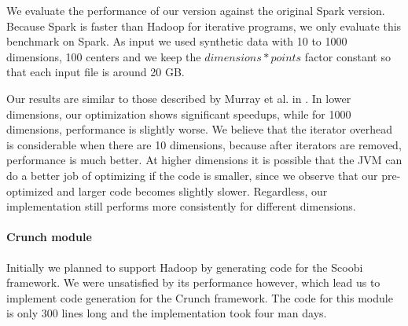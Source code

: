 We evaluate the performance of our version against the original Spark version.
Because Spark is faster than Hadoop for iterative programs, we only evaluate
this benchmark on Spark.
As input we used synthetic data with 10 to 1000 dimensions, 100 centers and we
keep the $dimensions * points$ factor constant so that each input file is around 20 GB.

Our results are similar to those described by Murray et al. in
\cite{murray_steno:_2011}. In lower dimensions, our optimization shows
significant speedups, while for 1000 dimensions, performance is
slightly worse. We believe that the iterator overhead is considerable when
there are 10 dimensions, because after iterators are removed, performance is
much better.
At higher dimensions it is possible that the JVM can do a better job of
optimizing if the code is smaller, since we observe that our pre-optimized and
larger code becomes slightly slower. Regardless, our implementation
still performs more consistently for different dimensions.


\paragraph{Crunch module}
Initially we planned to support Hadoop by generating code for the Scoobi
\cite{scoobi} framework. We were unsatisfied by its performance however, which
lead us to implement code generation for the Crunch framework. The code for
this module is only 300 lines long and the implementation took four man days.
